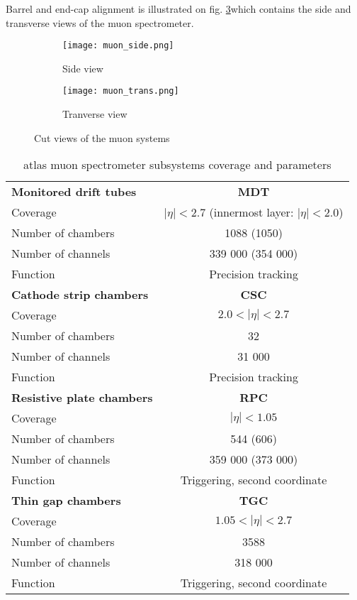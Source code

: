 	 Barrel and end-cap alignment is illustrated on fig. \ref{fig::muon_cut}which contains the side and transverse views of the muon spectrometer.
	\begin{figure}[htbp]
		\begin{subfigure}[t]{0.65\textwidth}
			\texttt{[image: muon\_side.png]}
			\caption[Side view]{Side view}
			\label{fig::side}
		\end{subfigure}
		\hfill
		\begin{subfigure}[t]{0.33\textwidth} 
			\texttt{[image: muon\_trans.png]}
			\caption[Tranverse view]{Tranverse view}
			\label{fig::transverse}
		\end{subfigure}
		\caption{Cut views of the muon systems}
		\label{fig::muon_cut}
	\end{figure}
	
	\begin{table}
	\centering
	\begin{tabular}{|l|c|}
		\hline	
		\textbf{Monitored drift tubes} & \textbf{MDT} \\
		Coverage & $|\eta| < 2.7$ (innermost layer: $|\eta| < 2.0$) \\
		Number of chambers  & 1088 (1050)\\
		Number of channels  & 339 000 (354 000)\\
		Function  & Precision tracking\\
		\hline	
		\textbf{Cathode strip chambers} & \textbf{CSC} \\
		Coverage & $2.0 < |\eta| < 2.7$  \\
		Number of chambers  & 32\\
		Number of channels  & 31 000\\
		Function  & Precision tracking\\
		\hline	
		\textbf{Resistive plate chambers} & \textbf{RPC} \\
		Coverage & $|\eta| < 1.05$  \\
		Number of chambers  & 544 (606)\\
		Number of channels  & 359 000 (373 000)\\
		Function  & Triggering, second coordinate\\
		\hline	
		\textbf{Thin gap chambers} & \textbf{TGC} \\
		Coverage & $1.05 < |\eta| < 2.7$  \\
		Number of chambers  & 3588\\
		Number of channels  & 318 000\\
		Function  & Triggering, second coordinate\\
		\hline	
	\end{tabular}\\
	\caption{ \gls{atlas} muon spectrometer subsystems coverage and parameters}
	\label{tab::muon_table}
\end{table}

